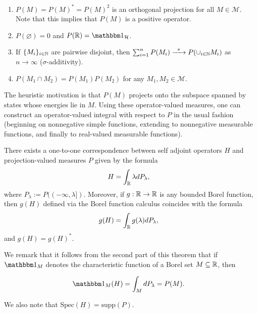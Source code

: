 \documentclass[12pt, letterpaper]{article}
\begin{document}
\begin{enumerate}
\item $P(M)=P(M)^*=P(M)^2$ is an orthogonal projection for all $M\in\mathcal{M}$. Note that this implies that $P(M)$ is a positive operator.
\item $P(\varnothing)=0$ and $P(\R)=\One_\mathcal{H}$.
\item If $\{M_i\}_{i\in\mathbb{N}}$ are pairwise disjoint, then $\sum_{i=1}^n P(M_i) \xrightarrow{\enskip s \enskip}P(\cup_{i\in\mathbb{N}} M_i)$ as $n\to\infty$ ($\sigma$-additivity).
\item $P(M_1\cap M_2) = P(M_1)P(M_2)$ for any $M_1,M_2\in\mathcal{M}$.
\end{enumerate}

The heuristic motivation is that $P(M)$ projects onto the subspace spanned by states whose energies lie in $M$. Using these operator-valued measures, one can construct an operator-valued integral with respect to $P$ in the usual fashion (beginning on nonnegative simple functions, extending to nonnegative measurable functions, and finally to real-valued measurable functions).

\begin{theorem}
There exists a one-to-one correspondence between self adjoint operators $H$ and projection-valued measures $P$ given by the formula
\[H = \int_{\mathbb{R}} \lambda dP_\lambda,\]
where $P_\lambda := P((-\infty,\lambda])$. Moreover, if $g:\mathbb{R}\to\mathbb{R}$ is any bounded Borel function, then $g(H)$ defined via the Borel function calculus coincides with the formula
\[g(H) = \int_{\mathbb{R}} g(\lambda) dP_\lambda,\]
and $g(H) = g(H)^*$.
\end{theorem}

We remark that it follows from the second part of this theorem that if $\One_{M}$ denotes the characteristic function of a Borel set $M\subseteq \mathbb{R}$, then 

\[\One_M(H) = \int_M dP_\lambda = P(M).\]

We also note that $\text{Spec}(H) = \text{supp}(P)$.
\end{document}
